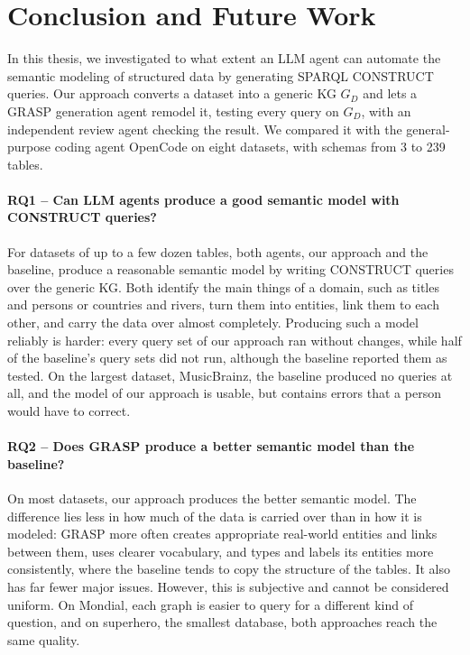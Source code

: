 \section{Conclusion and Future Work}\label{sec:conclusion}

In this thesis, we investigated to what extent an LLM agent can automate the semantic modeling of structured data by generating SPARQL CONSTRUCT queries. Our approach converts a dataset into a generic KG \(G_D\) and lets a GRASP generation agent remodel it, testing every query on \(G_D\), with an independent review agent checking the result. We compared it with the general-purpose coding agent OpenCode on eight datasets, with schemas from 3 to 239 tables.

\paragraph{RQ1 -- Can LLM agents produce a good semantic model with CONSTRUCT queries?}
For datasets of up to a few dozen tables, both agents, our approach and the baseline, produce a reasonable semantic model by writing CONSTRUCT queries over the generic KG. Both identify the main things of a domain, such as titles and persons or countries and rivers, turn them into entities, link them to each other, and carry the data over almost completely. Producing such a model reliably is harder: every query set of our approach ran without changes, while half of the baseline's query sets did not run, although the baseline reported them as tested. On the largest dataset, MusicBrainz, the baseline produced no queries at all, and the model of our approach is usable, but contains errors that a person would have to correct.

\paragraph{RQ2 -- Does GRASP produce a better semantic model than the baseline?}
On most datasets, our approach produces the better semantic model. The difference lies less in how much of the data is carried over than in how it is modeled: GRASP more often creates appropriate real-world entities and links between them, uses clearer vocabulary, and types and labels its entities more consistently, where the baseline tends to copy the structure of the tables. It also has far fewer major issues. However, this is subjective and cannot be considered uniform. On Mondial, each graph is easier to query for a different kind of question, and on superhero, the smallest database, both approaches reach the same quality.

